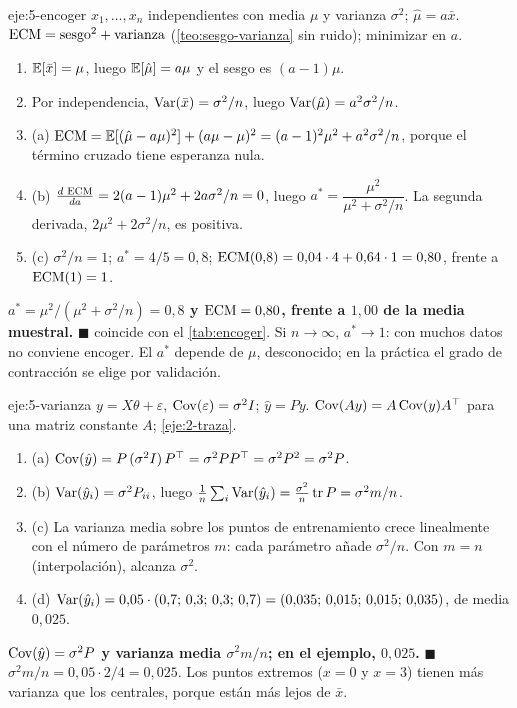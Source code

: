 \begin{solucion}{eje:5-encoger}
\datos $x_1,\dots,x_n$ independientes con media $\mu$ y varianza $\sigma^{2}$; $\hat\mu=a\bar x$.
\planteamiento $\operatorname{ECM}=\text{sesgo}^{2}+\text{varianza}$ (\cref{teo:sesgo-varianza} sin ruido); minimizar en $a$.
\pasos
\begin{enumerate}[label=\arabic*.]
  \item $\mathbb{E}[\bar x]=\mu$, luego $\mathbb{E}[\hat\mu]=a\mu$ y el sesgo es $(a-1)\mu$.
  \item Por independencia, $\operatorname{Var}(\bar x)=\sigma^{2}/n$, luego $\operatorname{Var}(\hat\mu)=a^{2}\sigma^{2}/n$.
  \item (a) $\operatorname{ECM}=\mathbb{E}[(\hat\mu-a\mu)^{2}]+(a\mu-\mu)^{2}=(a-1)^{2}\mu^{2}+a^{2}\sigma^{2}/n$, porque el término cruzado tiene esperanza nula.
  \item (b) $\frac{d\,\operatorname{ECM}}{da}=2(a-1)\mu^{2}+2a\sigma^{2}/n=0$, luego $a^{*}=\dfrac{\mu^{2}}{\mu^{2}+\sigma^{2}/n}$. La segunda derivada, $2\mu^{2}+2\sigma^{2}/n$, es positiva.
  \item (c) $\sigma^{2}/n=1$; $a^{*}=4/5=0{,}8$; $\operatorname{ECM}(0{,}8)=0{,}04\cdot 4+0{,}64\cdot 1=0{,}80$, frente a $\operatorname{ECM}(1)=1$.
\end{enumerate}
\resultado \textbf{$a^{*}=\mu^{2}/(\mu^{2}+\sigma^{2}/n)=0{,}8$ y $\operatorname{ECM}=0{,}80$, frente a $1{,}00$ de la media muestral.} $\blacksquare$
\comprobacion coincide con el \cref{tab:encoger}. Si $n\to\infty$, $a^{*}\to 1$: con muchos datos no conviene encoger. El $a^{*}$ depende de $\mu$, desconocido; en la práctica el grado de contracción se elige por validación.
\end{solucion}

\begin{solucion}{eje:5-varianza}
\datos $y=X\theta+\varepsilon$, $\operatorname{Cov}(\varepsilon)=\sigma^{2}I$; $\hat y=Py$.
\planteamiento $\operatorname{Cov}(Ay)=A\operatorname{Cov}(y)A^{\top}$ para una matriz constante $A$; \cref{eje:2-traza}.
\pasos
\begin{enumerate}[label=\arabic*.]
  \item (a) $\operatorname{Cov}(\hat y)=P\,(\sigma^{2}I)\,P^{\top}=\sigma^{2}PP^{\top}=\sigma^{2}P^{2}=\sigma^{2}P$.
  \item (b) $\operatorname{Var}(\hat y_i)=\sigma^{2}P_{ii}$, luego $\frac1n\sum_i\operatorname{Var}(\hat y_i)=\frac{\sigma^{2}}{n}\operatorname{tr} P=\sigma^{2}m/n$.
  \item (c) La varianza media sobre los puntos de entrenamiento crece linealmente con el número de parámetros $m$: cada parámetro añade $\sigma^{2}/n$. Con $m=n$ (interpolación), alcanza $\sigma^{2}$.
  \item (d) $\operatorname{Var}(\hat y_i)=0{,}05\cdot(0{,}7;\,0{,}3;\,0{,}3;\,0{,}7)=(0{,}035;\,0{,}015;\,0{,}015;\,0{,}035)$, de media $0{,}025$.
\end{enumerate}
\resultado \textbf{$\operatorname{Cov}(\hat y)=\sigma^{2}P$ y varianza media $\sigma^{2}m/n$; en el ejemplo, $0{,}025$.} $\blacksquare$
\comprobacion $\sigma^{2}m/n=0{,}05\cdot 2/4=0{,}025$. Los puntos extremos ($x=0$ y $x=3$) tienen más varianza que los centrales, porque están más lejos de $\bar x$.
\end{solucion}

